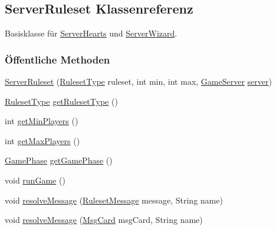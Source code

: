 \hypertarget{a00068}{\subsection{Server\-Ruleset Klassenreferenz}
\label{a00068}
}


Basisklasse für \hyperlink{a00067}{Server\-Hearts} und \hyperlink{a00069}{Server\-Wizard}.

\subsubsection*{Öffentliche Methoden}
\begin{DoxyCompactItemize}
\item 
\hyperlink{a00068_a3569f4e9a37061dd9a8edf575b9da359}{Server\-Ruleset} (\hyperlink{a00066}{Ruleset\-Type} ruleset, int min, int max, \hyperlink{a00072}{Game\-Server} \hyperlink{a00068_a116969e57d4337e33cd2a8869f3842c5}{server})
\item 
\hyperlink{a00066}{Ruleset\-Type} \hyperlink{a00068_a3ac0f377128f45d56b53fee6a22a525e}{get\-Ruleset\-Type} ()
\item 
int \hyperlink{a00068_ae52f9f6999c512f3fad72c38b1f212d7}{get\-Min\-Players} ()
\item 
int \hyperlink{a00068_aa019a8bc2bbcb20450ace4f9b481fc34}{get\-Max\-Players} ()
\item 
\hyperlink{a00060}{Game\-Phase} \hyperlink{a00068_a6cba00c7720cc8d49c42a6cd5cd7bca1}{get\-Game\-Phase} ()
\item 
\hypertarget{a00068_aa3a42b6202b319d9d236a4519d088e62}{void \hyperlink{a00068_aa3a42b6202b319d9d236a4519d088e62}{run\-Game} ()}\label{a00068_aa3a42b6202b319d9d236a4519d088e62}

\item 
void \hyperlink{a00068_a89a2114c62a2cc84346e559ac7bd2e4e}{resolve\-Message} (\hyperlink{a00053}{Ruleset\-Message} message, String name)
\item 
void \hyperlink{a00068_a6d3efb780af34e5f927186782d0ee635}{resolve\-Message} (\hyperlink{a00043}{Msg\-Card} msg\-Card, String name)
\end{DoxyCompactItemize}
